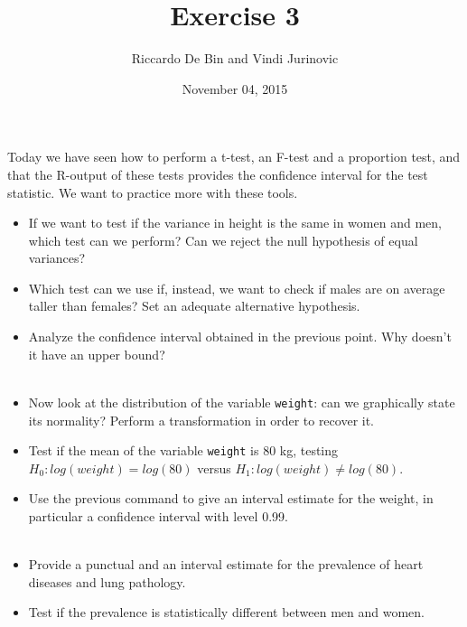 \documentclass[]{article}
\title{Exercise 3}
\author{Riccardo De Bin and Vindi Jurinovic}
\date{November 04, 2015}
\begin{document}
\maketitle


Today we have seen how to perform a t-test, an F-test and a proportion
test, and that the R-output of these tests provides the confidence
interval for the test statistic. We want to practice more with these
tools.

\begin{itemize}
\itemsep1pt\parskip0pt
\item
  If we want to test if the variance in height is the same in women and
  men, which test can we perform? Can we reject the null hypothesis of
  equal variances?\\
\item
  Which test can we use if, instead, we want to check if males are on
  average taller than females? Set an adequate alternative hypothesis.\\
\item
  Analyze the confidence interval obtained in the previous point. Why
  doesn't it have an upper bound?\\\\
\item
  Now look at the distribution of the variable \texttt{weight}: can we
  graphically state its normality? Perform a transformation in order to
  recover it.\\
\item
  Test if the mean of the variable \texttt{weight} is 80 kg, testing
  $H_0 : log(weight) = log(80)$ versus
  $H_1 : log(weight) \neq log(80)$.\\
\item
  Use the previous command to give an interval estimate for the weight,
  in particular a confidence interval with level 0.99.\\\\
\item
  Provide a punctual and an interval estimate for the prevalence of
  heart diseases and lung pathology.\\
\item
  Test if the prevalence is statistically different between men and
  women.
\end{itemize}
\end{document}
